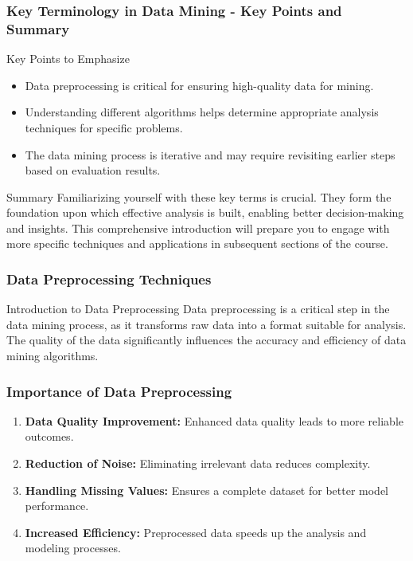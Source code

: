 \documentclass{beamer}
\begin{document}
\begin{frame}[fragile]
    \frametitle{Key Terminology in Data Mining - Key Points and Summary}
    \begin{block}{Key Points to Emphasize}
        \begin{itemize}
            \item Data preprocessing is critical for ensuring high-quality data for mining.
            \item Understanding different algorithms helps determine appropriate analysis techniques for specific problems.
            \item The data mining process is iterative and may require revisiting earlier steps based on evaluation results.
        \end{itemize}
    \end{block}

    \begin{block}{Summary}
        Familiarizing yourself with these key terms is crucial. They form the foundation upon which effective analysis is built, enabling better decision-making and insights. This comprehensive introduction will prepare you to engage with more specific techniques and applications in subsequent sections of the course.
    \end{block}
\end{frame}

\begin{frame}[fragile]
    \frametitle{Data Preprocessing Techniques}
    \begin{block}{Introduction to Data Preprocessing}
        Data preprocessing is a critical step in the data mining process, as it transforms raw data into a format suitable for analysis. The quality of the data significantly influences the accuracy and efficiency of data mining algorithms.
    \end{block}
\end{frame}

\begin{frame}[fragile]
    \frametitle{Importance of Data Preprocessing}
    \begin{enumerate}
        \item \textbf{Data Quality Improvement:} Enhanced data quality leads to more reliable outcomes.
        \item \textbf{Reduction of Noise:} Eliminating irrelevant data reduces complexity.
        \item \textbf{Handling Missing Values:} Ensures a complete dataset for better model performance.
        \item \textbf{Increased Efficiency:} Preprocessed data speeds up the analysis and modeling processes.
    \end{enumerate}
\end{frame}
\end{document}
